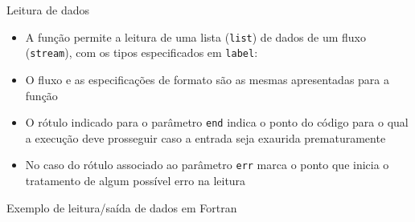 \begin{frame}[fragile]{Leitura de dados}

    \begin{itemize}
        \item A função  permite a leitura de uma lista (\texttt{list}) de
            dados de um fluxo (\texttt{stream}), com os tipos especificados em \texttt{label}:


        \item O fluxo e as especificações de formato são as mesmas apresentadas para a função

        \item O rótulo indicado para o parâmetro \texttt{end} indica o ponto do código para o qual
            a execução deve prosseguir caso a entrada seja exaurida prematuramente

        \item No caso do rótulo associado ao parâmetro \texttt{err} marca o ponto que inicia o
            tratamento de algum possível erro na leitura
    \end{itemize}

\end{frame}

\begin{frame}[fragile]{Exemplo de leitura/saída de dados em Fortran}
\end{frame}
